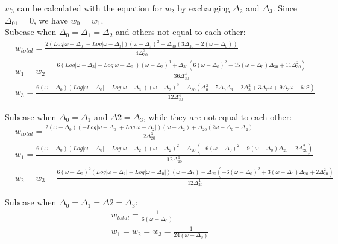 \documentclass[10pt]{article}
\begin{document}
$w_3$ can be calculated with the equation for $w_2$ by exchanging $\Delta_2$ and $\Delta_3$. Since $\Delta_{01}=0$, we have $w_0=w_1$.\\

Subcase when $\Delta_{0}=\Delta_{1}=\Delta_2$ and others not equal to each other:\\

\begin{subequations}\label{wtt3}
\begin{align}
&w_{total}=\frac{2(Log|\omega-\Delta_0|-Log|\omega-\Delta_3|)(\omega-\Delta_3)^2+\Delta_{30}(3\Delta_{30}-2(\omega-\Delta_0))}{4\Delta_{30}^3}\\
&w_{1}=w_2=\frac{6(Log|\omega-\Delta_3|-Log|\omega-\Delta_0|)(\omega-\Delta_3)^3+\Delta_{30}(6(\omega-\Delta_0)^2-15(\omega-\Delta_0)\Delta_{30}+11\Delta_{30}^2)}{36\Delta_{30}^4}\\
&w_3=\frac{6(\omega-\Delta_0)(Log|\omega-\Delta_0|-Log|\omega-\Delta_3|)(\omega-\Delta_3)^2+\Delta_{30}(\Delta_0^2-5\Delta_0\Delta_3-2\Delta_3^2+3\Delta_0\omega+9\Delta_3\omega-6\omega^2)}{12\Delta_{30}^4}
\end{align}
\end{subequations}

Subcase when $\Delta_{0}=\Delta_{1}$ and $\Delta{2}=\Delta_3$, while they are not equal to each other:\\

\begin{subequations}\label{wtt4}
\begin{align}
&w_{total}=\frac{2(\omega-\Delta_0)(-Log|\omega-\Delta_0|+Log|\omega-\Delta_2|)(\omega-\Delta_2)+\Delta_{20}(2\omega-\Delta_0-\Delta_2)}{2\Delta_{20}^3}\\
&w_{1}=\frac{6(\omega-\Delta_0)(Log|\omega-\Delta_0|-Log|\omega-\Delta_2|)(\omega-\Delta_2)^2+\Delta_{20}(-6(\omega-\Delta_0)^2+9(\omega-\Delta_0)\Delta_{20}-2\Delta_{20}^2)}{12\Delta_{20}^4}\\
&w_2=w_3=\frac{6(\omega-\Delta_0)^2(Log|\omega-\Delta_2|-Log|\omega-\Delta_0|)(\omega-\Delta_2)-\Delta_{20}(-6(\omega-\Delta_0)^2+3(\omega-\Delta_0)\Delta_{20}+2\Delta_{20}^2)}{12\Delta_{20}^4}
\end{align}
\end{subequations}

Subcase when $\Delta_{0}=\Delta_{1}=\Delta{2}=\Delta_3$:\\

\begin{subequations}\label{wtt5}
\begin{align}
&w_{total}=\frac{1}{6(\omega-\Delta_{0})}\\
&w_{1}=w_2=w_3=\frac{1}{24(\omega-\Delta_{0})}
\end{align}
\end{subequations}
\end{document}

